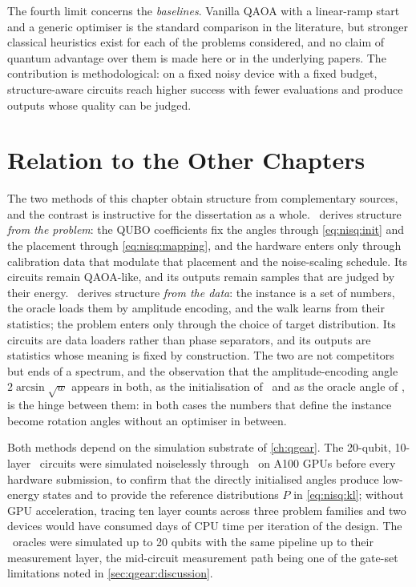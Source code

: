 The fourth limit concerns the \emph{baselines}. Vanilla QAOA with a linear-ramp start and a generic optimiser is the standard comparison in the literature, but stronger classical heuristics exist for each of the problems considered, and no claim of quantum advantage over them is made here or in the underlying papers. The contribution is methodological: on a fixed noisy device with a fixed budget, structure-aware circuits reach higher success with fewer evaluations and produce outputs whose quality can be judged.

\section{Relation to the Other Chapters}\label{sec:nisq:relation}

The two methods of this chapter obtain structure from complementary sources, and the contrast is instructive for the dissertation as a whole. \deal\ derives structure \emph{from the problem}: the QUBO coefficients fix the angles through \cref{eq:nisq:init} and the placement through \cref{eq:nisq:mapping}, and the hardware enters only through calibration data that modulate that placement and the noise-scaling schedule. Its circuits remain QAOA-like, and its outputs remain samples that are judged by their energy. \qawa\ derives structure \emph{from the data}: the instance is a set of numbers, the oracle loads them by amplitude encoding, and the walk learns from their statistics; the problem enters only through the choice of target distribution. Its circuits are data loaders rather than phase separators, and its outputs are statistics whose meaning is fixed by construction. The two are not competitors but ends of a spectrum, and the observation that the amplitude-encoding angle $2\arcsin\sqrt{w}$ appears in both, as the initialisation of \deal\ and as the oracle angle of \qawa, is the hinge between them: in both cases the numbers that define the instance become rotation angles without an optimiser in between.

Both methods depend on the simulation substrate of \cref{ch:qgear}. The 20-qubit, 10-layer \deal\ circuits were simulated noiselessly through \qgear\ on A100 GPUs before every hardware submission, to confirm that the directly initialised angles produce low-energy states and to provide the reference distributions $P$ in \cref{eq:nisq:kl}; without GPU acceleration, tracing ten layer counts across three problem families and two devices would have consumed days of CPU time per iteration of the design. The \qawa\ oracles were simulated up to 20 qubits with the same pipeline up to their measurement layer, the mid-circuit measurement path being one of the gate-set limitations noted in \cref{sec:qgear:discussion}.

